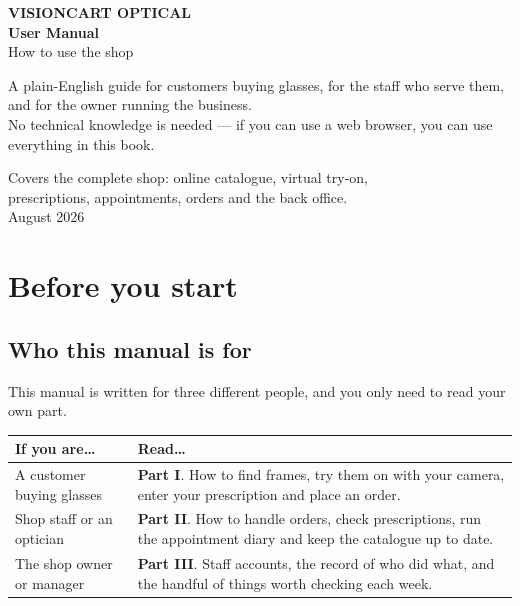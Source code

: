 \documentclass[11pt,a4paper]{report}
\begin{document}
\begin{titlepage}
\centering
\vspace*{2.2cm}

{\color{vcblue}\Large\bfseries VISIONCART OPTICAL}\\[2.2cm]

{\Huge\bfseries User Manual}\\[10pt]
{\LARGE\color{vcgrey} How to use the shop}\\[2.6cm]

\begin{minipage}{0.78\textwidth}
\centering\large\color{vcgrey}
A plain-English guide for customers buying glasses, for the staff who
serve them, and for the owner running the business.\\[10pt]
\normalsize No technical knowledge is needed --- if you can use a web
browser, you can use everything in this book.
\end{minipage}

\vfill

{\color{vcgrey}\small
Covers the complete shop: online catalogue, virtual try-on,\\
prescriptions, appointments, orders and the back office.\\[14pt]
August 2026}

\vspace{1.4cm}
\end{titlepage}

\chapter*{Before you start}

\section*{Who this manual is for}

This manual is written for three different people, and you only need to
read your own part.

\begin{longtable}{@{}p{}p{}@{}}
\toprule
\textbf{If you are\ldots} & \textbf{Read\ldots} \\
\midrule
\endhead
A customer buying glasses &
\textbf{Part I}. How to find frames, try them on with your camera, enter
your prescription and place an order. \\[6pt]
Shop staff or an optician &
\textbf{Part II}. How to handle orders, check prescriptions, run the
appointment diary and keep the catalogue up to date. \\[6pt]
The shop owner or manager &
\textbf{Part III}. Staff accounts, the record of who did what, and the
handful of things worth checking each week. \\
\bottomrule
\end{longtable}
\end{document}
